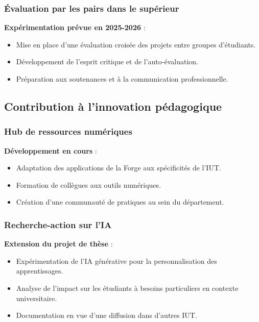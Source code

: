 \subsubsection{Évaluation par les pairs dans le supérieur}

\textbf{Expérimentation prévue en 2025-2026} :
\begin{itemize}[leftmargin=*]
    \item Mise en place d'une évaluation croisée des projets entre groupes d'étudiants.
    \item Développement de l'esprit critique et de l'auto-évaluation.
    \item Préparation aux soutenances et à la communication professionnelle.
\end{itemize}

\subsection{Contribution à l'innovation pédagogique}

\subsubsection{Hub de ressources numériques}

\textbf{Développement en cours} :
\begin{itemize}[leftmargin=*]
    \item Adaptation des applications de la Forge aux spécificités de l'IUT.
    \item Formation de collègues aux outils numériques.
    \item Création d'une communauté de pratiques au sein du département.
\end{itemize}

\subsubsection{Recherche-action sur l'IA}

\textbf{Extension du projet de thèse} :
\begin{itemize}[leftmargin=*]
    \item Expérimentation de l'IA générative pour la personnalisation des apprentissages.
    \item Analyse de l'impact sur les étudiants à besoins particuliers en contexte universitaire.
    \item Documentation en vue d'une diffusion dans d'autres IUT.
\end{itemize}

